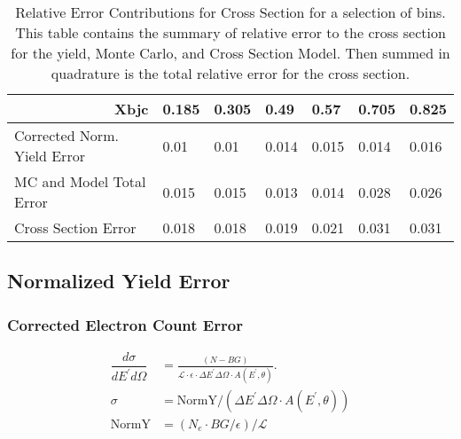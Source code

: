 \begin{table}[]
	\caption{Relative Error Contributions for Cross Section for a selection of bins. This table contains the summary of relative error to the cross section for the yield, Monte Carlo, and Cross Section Model. Then summed in quadrature is the total relative error for the cross section.}
	\label{ET_sum}
\begin{tabular}{|l|l|l|l|l|l|l|}
	\hline
	\multicolumn{1}{|r|}{Xbjc}        & \textbf{0.185} & \textbf{0.305} & \textbf{0.49} & \textbf{0.57} & \textbf{0.705} & \textbf{0.825} \\ \hline
	Corrected Norm. Yield Error       & 0.01           & 0.01           & 0.014         & 0.015         & 0.014          & 0.016          \\ \hline
	MC and Model Total Error & 0.015          & 0.015          & 0.013         & 0.014         & 0.028          & 0.026          \\ \hline
	Cross Section Error               & 0.018          & 0.018          & 0.019         & 0.021         & 0.031          & 0.031          \\ \hline
\end{tabular}
\end{table}

\subsection{Normalized Yield Error}
\subsubsection{Corrected Electron Count Error}
\begin{align}
\dfrac{d\sigma}{dE^{\prime}d\Omega} &= \frac{(N - BG)}{\mathscr{L} \cdot \epsilon \cdot \Delta E^{\prime} \Delta \Omega \cdot A(E^{\prime},\theta)}. \nonumber\\
\sigma &= \text{NormY}/\left(\Delta E^{\prime} \Delta \Omega \cdot A(E^{\prime},\theta)\right)\nonumber\\
\text{NormY} &= \left(N_e \cdot BG/\epsilon \right) / \mathscr{L}
\end{align}


